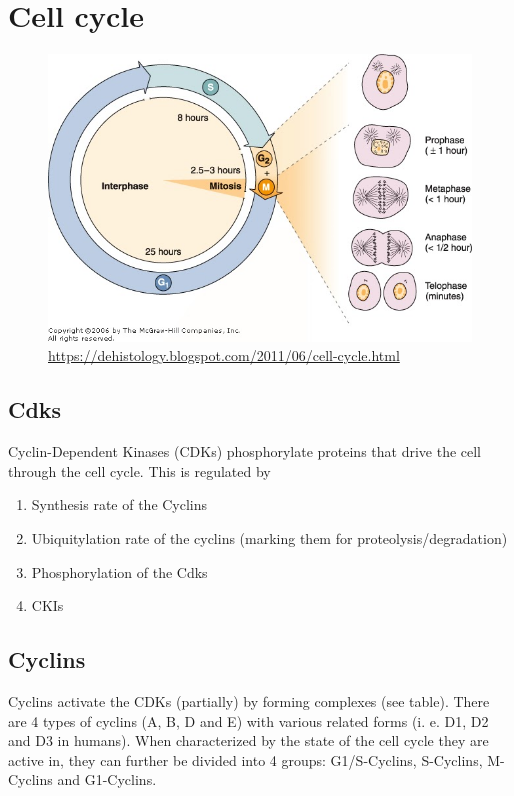 \documentclass{article}
\begin{document}
	\tableofcontents
	
	\section{Cell cycle}
	
	\begin{figure}[H]
		\centering
		\includegraphics[width=0.8\linewidth]{durations.jpg}
		\caption{\url{https://dehistology.blogspot.com/2011/06/cell-cycle.html}}
	\end{figure}
	
	\subsection{Cdks}
	Cyclin-Dependent Kinases (CDKs) phosphorylate proteins that drive the cell through the cell cycle. This is regulated by
	
	\begin{enumerate}
		\item Synthesis rate of the Cyclins
		\item Ubiquitylation rate of the cyclins (marking them for proteolysis/degradation)
		\item Phosphorylation of the Cdks
		\item CKIs
	\end{enumerate}
	
	\subsection{Cyclins}
	Cyclins activate the CDKs (partially) by forming complexes (see table). There are 4 types of cyclins (A, B, D and E) with various related forms (i. e. D1, D2 and D3 in humans). When characterized by the state of the cell cycle they are active in, they can further be divided into 4 groups: G1/S-Cyclins, S-Cyclins, M-Cyclins and G1-Cyclins.
	
\end{document}
